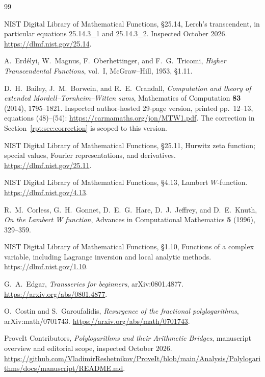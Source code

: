 \documentclass[11pt,a4paper]{article}
\numberwithin{equation}{section}
\theoremstyle{definition}\newtheorem{definition}[theorem]{Definition}
\theoremstyle{remark}\newtheorem{remark}[theorem]{Remark}
\begin{document}
\begin{thebibliography}{99}\raggedright
{}

NIST Digital Library of Mathematical Functions, \S25.14, Lerch's transcendent, in particular equations 25.14.3\_1 and 25.14.3\_2. Inspected October 2026. \url{https://dlmf.nist.gov/25.14}.

A.~Erd\'elyi, W.~Magnus, F.~Oberhettinger, and F.~G.~Tricomi,
\emph{Higher Transcendental Functions}, vol.~I, McGraw--Hill, 1953, \S1.11.

D.~H.~Bailey, J.~M.~Borwein, and R.~E.~Crandall,
\emph{Computation and theory of extended Mordell--Tornheim--Witten sums},
Mathematics of Computation \textbf{83} (2014), 1795--1821.
Inspected author-hosted 29-page version, printed pp.~12--13, equations (48)--(54):
\url{https://carmamaths.org/jon/MTW1.pdf}.
The correction in Section~\ref{rpt:sec:correction} is scoped to this version.

NIST Digital Library of Mathematical Functions, \S25.11, Hurwitz zeta function; special values, Fourier representations, and derivatives. \url{https://dlmf.nist.gov/25.11}.

NIST Digital Library of Mathematical Functions, \S4.13, Lambert $W$-function. \url{https://dlmf.nist.gov/4.13}.

R.~M.~Corless, G.~H.~Gonnet, D.~E.~G.~Hare, D.~J.~Jeffrey, and D.~E.~Knuth,
\emph{On the Lambert W function}, Advances in Computational Mathematics \textbf{5} (1996), 329--359.

NIST Digital Library of Mathematical Functions, \S1.10, Functions of a complex variable, including Lagrange inversion and local analytic methods. \url{https://dlmf.nist.gov/1.10}.

G.~A.~Edgar, \emph{Transseries for beginners}, arXiv:0801.4877. \url{https://arxiv.org/abs/0801.4877}.

O.~Costin and S.~Garoufalidis, \emph{Resurgence of the fractional polylogarithms}, arXiv:math/0701743. \url{https://arxiv.org/abs/math/0701743}.

ProveIt Contributors, \emph{Polylogarithms and their Arithmetic Bridges}, manuscript overview and editorial scope, inspected October 2026.
\url{https://github.com/VladimirReshetnikov/ProveIt/blob/main/Analysis/Polylogarithms/docs/manuscript/README.md}.


\end{thebibliography}
\end{document}
